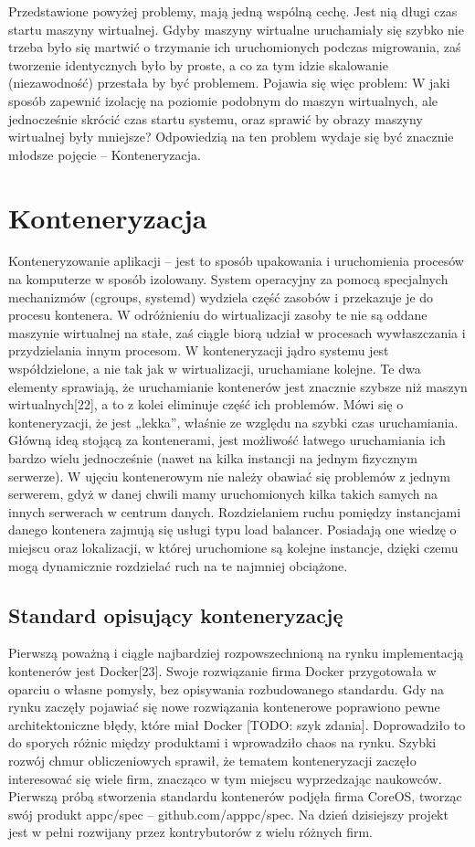 \documentclass[10pt,a4paper,titlepage,twoside]{report}
\begin{document}
\indent \indent Przedstawione powyżej problemy, mają jedną wspólną cechę. Jest nią długi czas startu maszyny wirtualnej. Gdyby maszyny wirtualne uruchamiały się szybko nie trzeba było się martwić o trzymanie ich uruchomionych podczas migrowania, zaś tworzenie identycznych było by proste, a co za tym idzie skalowanie (niezawodność) przestała by być problemem. Pojawia się więc problem: W jaki sposób zapewnić izolację na poziomie podobnym do maszyn wirtualnych, ale jednocześnie skrócić czas startu systemu, oraz sprawić by obrazy maszyny wirtualnej były mniejsze? Odpowiedzią na ten problem wydaje się być znacznie młodsze pojęcie – Konteneryzacja.

\section{Konteneryzacja}
\indent \indent Konteneryzowanie aplikacji – jest to sposób upakowania i uruchomienia procesów na komputerze w sposób izolowany. System operacyjny za pomocą specjalnych mechanizmów (cgroups, systemd) wydziela część zasobów i przekazuje je do procesu kontenera. W odróżnieniu do wirtualizacji zasoby te nie są oddane maszynie wirtualnej na stałe, zaś ciągle biorą udział w procesach wywłaszczania i przydzielania innym procesom. W konteneryzacji jądro systemu jest współdzielone, a nie tak jak w wirtualizacji, uruchamiane kolejne. Te dwa elementy sprawiają, że uruchamianie kontenerów jest znacznie szybsze niż maszyn wirtualnych[22], a to z kolei eliminuje część ich problemów. Mówi się o konteneryzacji, że jest „lekka”, właśnie ze względu na szybki czas uruchamiania. Główną ideą stojącą za kontenerami, jest możliwość łatwego uruchamiania ich bardzo wielu jednocześnie (nawet na kilka instancji na jednym fizycznym serwerze). W ujęciu kontenerowym nie należy obawiać się problemów z jednym serwerem, gdyż w danej chwili mamy uruchomionych kilka takich samych na innych serwerach w centrum danych. Rozdzielaniem ruchu pomiędzy instancjami danego kontenera zajmują się usługi typu load balancer. Posiadają one wiedzę o miejscu oraz lokalizacji, w której uruchomione są kolejne instancje, dzięki czemu mogą dynamicznie rozdzielać ruch na te najmniej obciążone.

\subsection{Standard opisujący konteneryzację}\indent \indent
Pierwszą poważną i ciągle najbardziej rozpowszechnioną na rynku implementacją kontenerów jest Docker[23]. Swoje rozwiązanie firma Docker przygotowała w oparciu o własne pomysły, bez opisywania rozbudowanego standardu. Gdy na rynku zaczęły pojawiać się nowe rozwiązania kontenerowe poprawiono pewne architektoniczne błędy, które miał Docker [TODO: szyk zdania]. Doprowadziło to do sporych różnic między produktami i wprowadziło chaos na rynku. Szybki rozwój chmur obliczeniowych sprawił, że tematem konteneryzacji zaczęło interesować się wiele firm, znacząco w tym miejscu wyprzedzając naukowców. Pierwszą próbą stworzenia standardu kontenerów podjęła firma CoreOS, tworząc swój produkt appc/spec – github.com/apppc/spec. Na dzień dzisiejszy projekt jest w pełni rozwijany przez kontrybutorów z wielu różnych firm.
\end{document}
